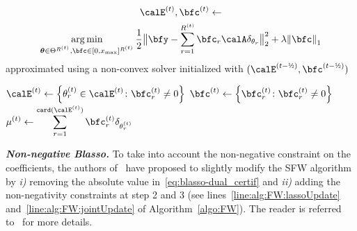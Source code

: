 \begin{algorithm}
{        \myspace
		{
		\setlength{\abovedisplayskip}{-1.5em}
		\begin{multline*}
		\ThetaIt{t},\vcoeffIt{t} \leftarrow \\ \kargmin_{\boldsymbol{\theta}\in\Theta^{R^{(t)}},\bfc\in[0, x_{\max}]^{R^{(t)}}} \frac{1}{2} \big\Vert{\bfy - \sum_{r=1}^{R^{(t)}} \bfc_r \opObs\spike{\theta_r}}\big\Vert_2^2 + \lambda\kvvbar{\bfc}_1
		\end{multline*}
		approximated using a non-convex solver initialized with $(\ThetaIt{t-\text{\textonehalf}},\bfc^{(t-\text{\textonehalf})})$
		\label{line:alg:FW:jointUpdate} \;
        }

        \myspace
		$\ThetaIt{t}\leftarrow \kset{\thetaIt{t}_r\in\ThetaIt{t}}{\vcoeffIt{t}_r\neq0}$ \;
		$\vcoeffIt{t} \leftarrow \kset{\vcoeffIt{t}_r}{\vcoeffIt{t}_r\neq0}$ \;
		$\displaystyle\muIt{t} \leftarrow \sum_{r=1}^{\texttt{card}(\ThetaIt{t})} \vcoeffIt{t}_r \delta_{\thetaIt{t}_r}$ \;
	}
\end{algorithm}


\textbf{\itshape Non-negative Blasso.}
To take into account the non-negative constraint on the coefficients, the authors of~\cite{denoyelle2019} have proposed to slightly modify the SFW algorithm by \textit{i)} removing the absolute value in~\eqref{eq:blasso-dual_certif} and \textit{ii)} adding the non-negativity constraints at step 2 and 3 (see lines~\ref{line:alg:FW:lassoUpdate} and~\ref{line:alg:FW:jointUpdate} of Algorithm~\ref{algo:FW}).
The reader is referred to~\cite[remark~8 in Section~4.1]{denoyelle2019} for more details.

\vspace*{1em}


